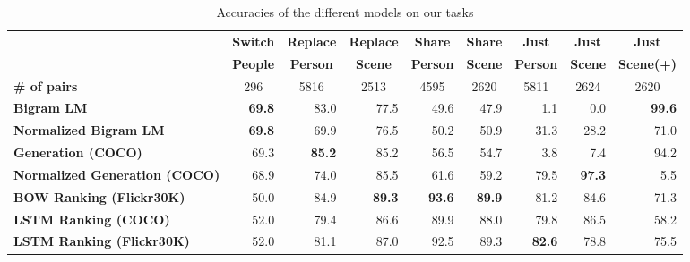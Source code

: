 \documentclass[11pt]{article}
\begin{document}
\begin{table*}[!t]
\centering
\begin{footnotesize}
\begin{tabular}{lrrrrrrrr}
\toprule                                
& \multicolumn{1}{c}{\bfseries  Switch}
& \multicolumn{1}{c}{\bfseries   Replace}   
& \multicolumn{1}{c}{\bfseries   Replace}  
& \multicolumn{1}{c}{\bfseries   Share} 
& \multicolumn{1}{c}{\bfseries   Share} 
& \multicolumn{1}{c}{\bfseries   Just}
& \multicolumn{1}{c}{\bfseries   Just}
& \multicolumn{1}{c}{\bfseries   Just}
\\
& \multicolumn{1}{c}{\bfseries  People}
& \multicolumn{1}{c}{\bfseries  Person }
& \multicolumn{1}{c}{\bfseries Scene }
& \multicolumn{1}{c}{\bfseries  Person }
& \multicolumn{1}{c}{\bfseries   Scene}
& \multicolumn{1}{c}{\bfseries   Person }
& \multicolumn{1}{c}{\bfseries  Scene}
& \multicolumn{1}{c}{\bfseries  Scene(+)}
\\
\bfseries \# of pairs 
&\multicolumn{1}{c}{296} 
& \multicolumn{1}{c}{5816}  
&\multicolumn{1}{c}{2513 }
&\multicolumn{1}{c}{4595}
&\multicolumn{1}{c}{2620}
&\multicolumn{1}{c}{5811 }
&\multicolumn{1}{c}{2624}
&\multicolumn{1}{c}{2620}
 
\\ \midrule
\bfseries  Bigram LM                  
& \bf 69.8 
& 83.0
& 77.5 
& 49.6   
& 47.9   
& 1.1 
& 0.0 
& \bf 99.6      \\
  \bfseries Normalized Bigram LM 
& \bf 69.8 
& 69.9
& 76.5
& 50.2 
   & 50.9    
& 31.3
& 28.2   
& 71.0   \\
\bfseries Generation   (COCO)                          
& 69.3  
& \bf 85.2 
& 85.2 
& 56.5  
& 54.7  
& 3.8 
& 7.4 
& 94.2  \\
\bfseries  Normalized Generation (COCO)              
& 68.9   
& 74.0 
& 85.5
& 61.6   
& 59.2
& 79.5 
& \bf 97.3  
& 5.5      \\
\midrule
\bfseries  BOW Ranking (Flickr30K) 
& 50.0 
& 84.9
& \bf 89.3
& \bf 93.6   
& \bf 89.9
& 81.2 
& 84.6
& 71.3 \\
\bfseries  LSTM Ranking (COCO)                             
& 52.0
& 79.4 
& 86.6
& 89.9  
& 88.0
& 79.8 
& 86.5
& 58.2      \\
\bfseries  LSTM Ranking (Flickr30K)                             
& 52.0 
& 81.1 
& 87.0
& 92.5    
& 89.3 
&\bf 82.6 
& 78.8 
& 75.5  
  \\

\bottomrule
\end{tabular}
\caption{Accuracies of the different models on our tasks }
\label{tab:Results}
\end{footnotesize}
\end{table*}
\end{document}
